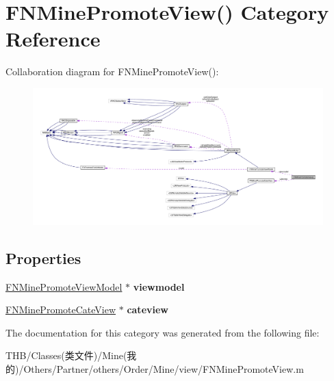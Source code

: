 \hypertarget{category_f_n_mine_promote_view_07_08}{}\section{F\+N\+Mine\+Promote\+View() Category Reference}
\label{category_f_n_mine_promote_view_07_08}


Collaboration diagram for F\+N\+Mine\+Promote\+View()\+:\nopagebreak
\begin{figure}[H]
\begin{center}
\leavevmode
\includegraphics[width=350pt]{category_f_n_mine_promote_view_07_08__coll__graph}
\end{center}
\end{figure}
\subsection*{Properties}
\begin{DoxyCompactItemize}
\item 
\mbox{\label{category_f_n_mine_promote_view_07_08_a3c9a93378411522b696b6ae098dd75de}} 
\mbox{\hyperlink{interface_f_n_mine_promote_view_model}{F\+N\+Mine\+Promote\+View\+Model}} $\ast$ {\bfseries viewmodel}
\item 
\mbox{\label{category_f_n_mine_promote_view_07_08_a6582db6e2c85189206c141196960b379}} 
\mbox{\hyperlink{interface_f_n_mine_promote_cate_view}{F\+N\+Mine\+Promote\+Cate\+View}} $\ast$ {\bfseries cateview}
\end{DoxyCompactItemize}


The documentation for this category was generated from the following file\+:\begin{DoxyCompactItemize}
\item 
T\+H\+B/\+Classes(类文件)/\+Mine(我的)/\+Others/\+Partner/others/\+Order/\+Mine/view/F\+N\+Mine\+Promote\+View.\+m\end{DoxyCompactItemize}
